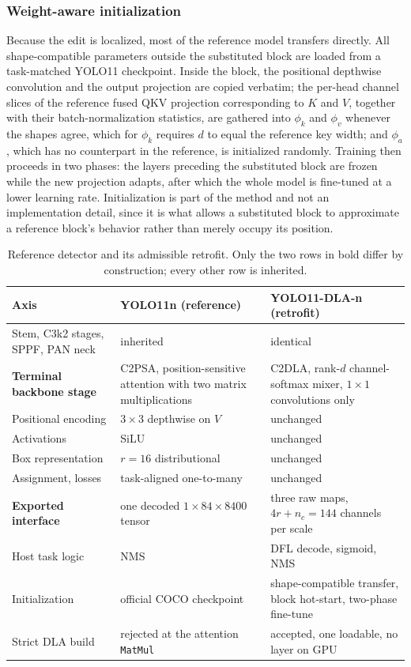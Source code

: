 \subsubsection{Weight-aware initialization}
Because the edit is localized, most of the reference model transfers directly.
All shape-compatible parameters outside the substituted block are loaded from a
task-matched YOLO11 checkpoint. Inside the block, the positional depthwise
convolution and the output projection are copied verbatim; the per-head
channel slices of the reference fused QKV projection corresponding to $K$ and
$V$, together with their batch-normalization statistics, are gathered into
$\phi_k$ and $\phi_v$ whenever the shapes agree, which for $\phi_k$ requires
$d$ to equal the reference key width; and $\phi_a$, which has no counterpart in
the reference, is initialized randomly. Training then proceeds in two phases:
the layers preceding the substituted block are frozen while the new projection
adapts, after which the whole model is fine-tuned at a lower learning rate.
Initialization is part of the method and not an implementation detail, since it
is what allows a substituted block to approximate a reference block's behavior
rather than merely occupy its position.

\begin{table}[t]
\caption{Reference detector and its admissible retrofit. Only the two rows in
bold differ by construction; every other row is inherited.}
\label{tab:design}
\centering
\scriptsize
\setlength{\tabcolsep}{2.5pt}
\renewcommand{\arraystretch}{1.1}
\begin{tabular}{p{}p{}p{}}
\toprule
Axis & YOLO11n (reference) & YOLO11-DLA-n (retrofit) \\
\midrule
Stem, C3k2 stages, SPPF, PAN neck & inherited & identical \\
\textbf{Terminal backbone stage} & C2PSA, position-sensitive attention with
two matrix multiplications & C2DLA, rank-$d$ channel-softmax mixer, $1\times1$
convolutions only \\
Positional encoding & $3\times3$ depthwise on $V$ & unchanged \\
Activations & SiLU & unchanged \\
Box representation & $r=16$ distributional & unchanged \\
Assignment, losses & task-aligned one-to-many & unchanged \\
\textbf{Exported interface} & one decoded $1\times84\times8400$ tensor &
three raw maps, $4r+n_c=144$ channels per scale \\
Host task logic & NMS & DFL decode, sigmoid, NMS \\
Initialization & official COCO checkpoint & shape-compatible transfer, block
hot-start, two-phase fine-tune \\
Strict DLA build & rejected at the attention \texttt{MatMul} & accepted, one
loadable, no layer on GPU \\
\bottomrule
\end{tabular}
\end{table}

